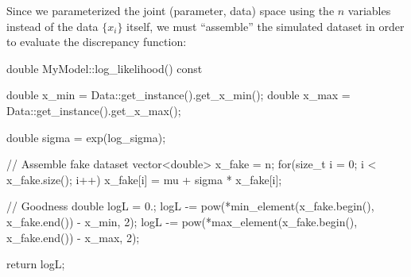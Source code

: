 \documentclass[article]{jss}
\begin{document}
Since we parameterized the joint (parameter, data) space using the
$n$ variables instead of the data $\{x_i\}$ itself, we must
``assemble'' the simulated dataset in order to evaluate the
discrepancy function:
%
\begin{CodeChunk}
\begin{CodeInput}
double MyModel::log_likelihood() const
{
    double x_min = Data::get_instance().get_x_min();
    double x_max = Data::get_instance().get_x_max();

    double sigma = exp(log_sigma);

    // Assemble fake dataset
    vector<double> x_fake = n;
    for(size_t i = 0; i < x_fake.size(); i++)
        x_fake[i] = mu + sigma * x_fake[i];

    // Goodness
    double logL = 0.;
    logL -= pow(*min_element(x_fake.begin(), x_fake.end()) - x_min, 2);
    logL -= pow(*max_element(x_fake.begin(), x_fake.end()) - x_max, 2);

    return logL;
}
\end{CodeInput}
\end{CodeChunk}
%
\end{document}
